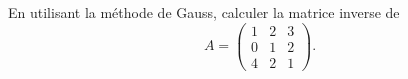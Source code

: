 
\begin{exercice}\label{exoSerieCinq0003}

En utilisant la méthode de Gauss, calculer la matrice inverse de 
\begin{equation}
	A=\begin{pmatrix}
		1	&	2	&	3	\\
		0	&	1	&	2	\\
		4	&	2	&	1
	\end{pmatrix}.
\end{equation}

\end{exercice}
